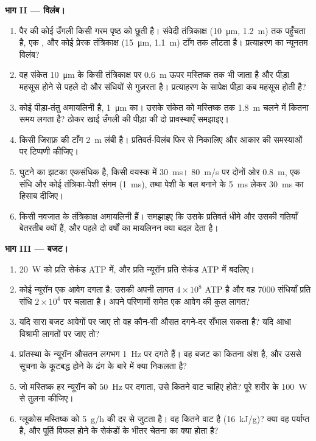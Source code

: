 \begin{problem}
\medskip
\noindent\textbf{भाग II --- विलंब।}
\begin{enumerate}[resume]
  \item पैर की कोई उँगली किसी गरम पृष्ठ को छूती है। संवेदी तंत्रिकाक्ष
        (\qty{10}{\micro m}, \qty{1.2}{m})  तक पहुँचता है, एक
        , और कोई प्रेरक तंत्रिकाक्ष
        (\qty{15}{\micro m}, \qty{1.1}{m}) टाँग तक लौटता है।
        प्रत्याहरण का न्यूनतम विलंब?
  \item वह संकेत \qty{10}{\micro m} के किसी तंत्रिकाक्ष पर
        \qty{0.6}{m} ऊपर मस्तिष्क तक भी जाता है और पीड़ा महसूस होने से
        पहले दो और संधियों से गुज़रता है। प्रत्याहरण के सापेक्ष पीड़ा
        कब महसूस होती है?
  \item कोई पीड़ा-तंतु अमायलिनी है, \qty{1}{\micro m} का। उसके संकेत
        को मस्तिष्क तक \qty{1.8}{m} चलने में कितना समय लगता है? ठोकर
        खाई उँगली की पीड़ा की दो प्रावस्थाएँ समझाइए।
  \item किसी जिराफ़ की टाँग \qty{2}{m} लंबी है। प्रतिवर्त-विलंब फिर से
        निकालिए और आकार की समस्याओं पर टिप्पणी कीजिए।
  \item घुटने का झटका एकसंधिक है, किसी वयस्क में \qty{30}{ms}।
        \qty{80}{m/s} पर दोनों ओर \qty{0.8}{m}, एक संधि और कोई
        तंत्रिका-पेशी संगम (\qty{1}{ms}), तथा पेशी के बल बनाने के
        \qty{5}{ms} लेकर \qty{30}{ms} का हिसाब दीजिए।
  \item किसी नवजात के तंत्रिकाक्ष अमायलिनी हैं। समझाइए कि उसके
        प्रतिवर्त धीमे और उसकी गतियाँ बेतरतीब क्यों हैं, और पहले दो
        वर्षों का मायलिनन क्या बदल देता है।
\end{enumerate}

\medskip
\noindent\textbf{भाग III --- बजट।}
\begin{enumerate}[resume]
  \item \qty{20}{W} को प्रति सेकंड ATP में, और प्रति न्यूरॉन प्रति
        सेकंड ATP में बदलिए।
  \item कोई न्यूरॉन एक आवेग दगता है: उसकी अपनी लागत $4\times 10^{8}$
        ATP है और वह \num{7000} संधियाँ प्रति संधि $2\times 10^{4}$ पर
        चलाता है। अपने परिणामों समेत एक आवेग की कुल लागत?
  \item यदि सारा बजट आवेगों पर जाए तो वह कौन-सी औसत दगने-दर सँभाल सकता
        है? यदि आधा विश्रामी लागतों पर जाए तो?
  \item प्रांतस्था के न्यूरॉन औसतन लगभग \qty{1}{Hz} पर दगते हैं। वह
        बजट का कितना अंश है, और उससे सूचना के कूटबद्ध होने के ढंग के
        बारे में क्या निकलता है?
  \item जो मस्तिष्क हर न्यूरॉन को \qty{50}{Hz} पर दगाता, उसे कितने वाट
        चाहिए होते? पूरे शरीर के \qty{100}{W} से तुलना कीजिए।
  \item ग्लूकोस मस्तिष्क को \qty{5}{g/h} की दर से जुटता है। वह कितने
        वाट है (\qty{16}{kJ/g})? क्या वह पर्याप्त है, और पूर्ति विफल
        होने के सेकंडों के भीतर चेतना का क्या होता है?
\end{enumerate}


\end{problem}
